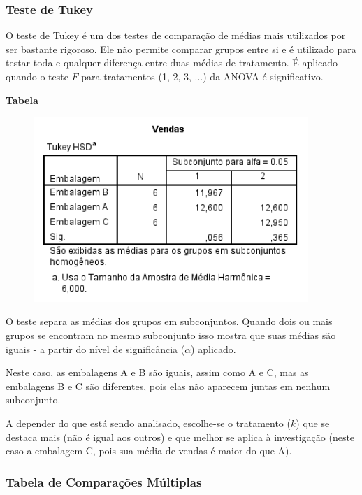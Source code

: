 		\subsubsection{Teste de Tukey}

			O teste de Tukey é um dos testes de comparação de médias mais utilizados por ser bastante rigoroso. Ele não permite comparar grupos entre si e é utilizado para testar toda e qualquer diferença entre duas médias de tratamento. É aplicado quando o teste $ F $ para tratamentos (1, 2, 3, ...) da ANOVA é significativo.

			\bigskip
			
			\textbf{Tabela}	

				\begin{figure}[H]
					\centering			
					\includegraphics[height=7cm]{images/anova_tukey}
				\end{figure}

				O teste separa as médias dos grupos em subconjuntos. Quando dois ou mais grupos se encontram no mesmo subconjunto isso mostra que suas médias são iguais - a partir do nível de significância ($ \alpha $) aplicado.

				Neste caso, as embalagens A e B são iguais, assim como A e C, mas as embalagens B e C são diferentes, pois elas não aparecem juntas em nenhum subconjunto.

				A depender do que está sendo analisado, escolhe-se o tratamento ($ k $) que se destaca mais (não é igual aos outros) e que melhor se aplica à investigação (neste caso a embalagem C, pois sua média de vendas é maior do que A).
				
		\subsubsection{Tabela de Comparações Múltiplas}

